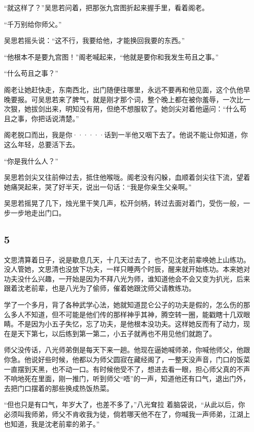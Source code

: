 “就这样了？”吴思若问着，把那张九宫图折起来握手里，看着阁老。

“千万别给你师父。”

吴思若摇头说：“这不行，我要给他，才能换回我要的东西。”

“他根本不是要九宫图！”阁老喊起来，“他就是要你和我发生苟且之事。”

“什么苟且之事？”

阁老让她赶快走，东南西北，出门随便往哪里，永远不要再和他见面，这个仇他早晚要报。可吴思若来了脾气，就是刚才那个词，整个晚上都在被你羞辱，一次比一次狠，她拔剑出来，明知没有用，但绝不想服软了。她剑尖对着他逼问：“什么苟且之事，你把话说清楚。”

阁老脱口而出，我是你······话到一半他又咽下去了。他说不能让你知道，你这么年轻，总要活下去。

“你是我什么人？”

吴思若剑尖又往前伸过去，抵住他喉咙。阁老没有闪躲，血顺着剑尖往下流，望着她痛哭起来，哭了好半天，说出一句话：“我是你亲生父亲啊。”

吴思若摇晃了几下，烛光里干笑几声，松开剑柄，转过去面对着门，受伤一般，一步一步地走出门口。
\newline

{\centering\subsection{5}}

文思清算着日子，说是歇息几天，十几天过去了，也不见沈老前辈唤她上山练功。没人管她，文思清也没放下功夫，一样只睡两个时辰，醒来就开始练功。本来她对功夫没什么兴趣，一开始是因为不拜八光为师，谁知道他会不会又变为扒光，后来跟着沈老前辈，也是八光为了偷师，催着她跟沈师父请教练功。

学了一个多月，背了各种武学心法，她就知道昆仑公子的功夫是假的，怎么伤的那么多人不知道，但不可能是他们传的那样神乎其神，腾空转一圈，能戳瞎十几双眼睛。不是因为小五子失忆，忘了功夫，是他根本没功夫。这样她反而有了动力，现在是天下第七，以后练到第一第二，小五子就再也不用见他们就跑了。

师父没传话，八光师弟倒是每天下来一趟。他现在逼她喊师弟，你喊他师父，他跟你急。他说好些时候，他都以为师父圆寂在藏经阁了，一整天没声音，门口的饭菜一直摆到天黑，也不动一口。有时候他受不了，想进去看一眼，担心师父真的不声不响地死在里面，刚一推门，听到师父“唔”的一声，知道他还有口气，退出门外，去把门口摆着的那些换成热饭热菜。

“但也只是有口气，年岁大了，也差不多了，”八光耷拉
着脑袋说，“从此以后，你必须叫我师弟，师父不肯收我为徒，倘若哪天他不在了，你喊我一声师弟，江湖上也知道，我是沈老前辈的弟子。”

